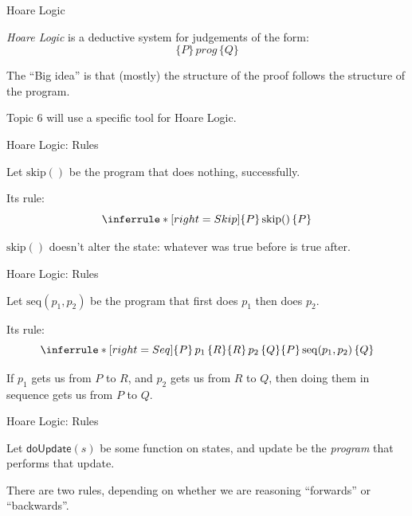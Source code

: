 \documentclass[xetex,aspectratio=169,14pt,hyperref={pdfpagelabels=true,pdflang={en-GB}}]{beamer}
\begin{document}
\begin{frame}
  {Hoare Logic}

  \emph{Hoare Logic} is a deductive system for judgements of the form:
  \begin{displaymath}
    \{ P \}\, \mathit{prog}\, \{ Q \}
  \end{displaymath}

  \bigskip

  The ``Big idea'' is that (mostly) the structure of the proof follows
  the structure of the program.

  \bigskip

  Topic 6 will use a specific tool for Hoare Logic.
\end{frame}

\begin{frame}
  {Hoare Logic: Rules}

  Let $\mathrm{skip}()$ be the program that does nothing, successfully.

  \bigskip

  Its rule:
  \begin{displaymath}
    \inferrule* [right=Skip]
    { }
    {\{ P \}\, \mathrm{skip}()\, \{ P \}}
  \end{displaymath}

  \bigskip

  $\mathrm{skip}()$ doesn't alter the state: whatever was true before is true after.
\end{frame}

\begin{frame}
  {Hoare Logic: Rules}

  Let $\mathrm{seq}(p_1,p_2)$ be the program that first does $p_1$ then does $p_2$.

  \bigskip

  Its rule:
  \begin{displaymath}
    \inferrule* [right=Seq]
    {\{ P \}\,p_1\,\{ R \} \\ \{ R \}\,p_2\,\{ Q \}}
    {\{ P \}\,\mathrm{seq}(p_1,p_2)\,\{ Q \}}
  \end{displaymath}

  \bigskip

  If $p_1$ gets us from $P$ to $R$, and $p_2$ gets us from $R$ to $Q$,
  then doing them in sequence gets us from $P$ to $Q$.
\end{frame}

\begin{frame}
  {Hoare Logic: Rules}

  Let $\mathsf{doUpdate}(s)$ be some function on states, and
  $\mathrm{update}$ be the \emph{program} that performs that update.

  \bigskip

  There are two rules, depending on whether we are reasoning
  ``forwards'' or ``backwards''.
\end{frame}
\end{document}
